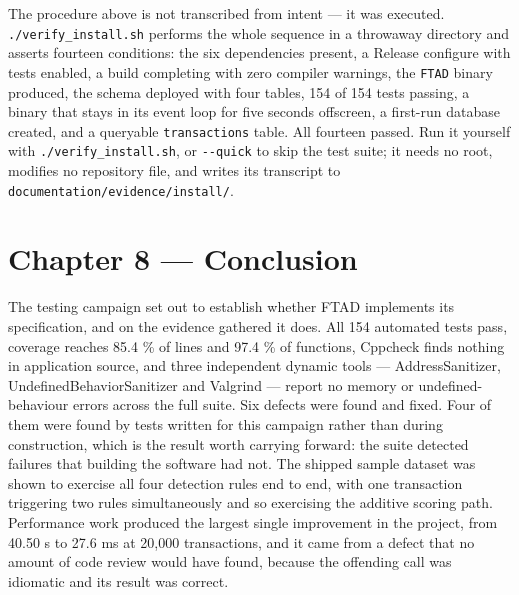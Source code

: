 \documentclass[
  12pt,
]{report}
\begin{document}
The procedure above is not transcribed from intent --- it was executed.
\texttt{./\allowbreak{}verify\_install.sh} performs the whole sequence in a throwaway
directory and asserts fourteen conditions: the six dependencies present,
a Release configure with tests enabled, a build completing with zero
compiler warnings, the \texttt{FTAD} binary produced, the schema
deployed with four tables, 154 of 154 tests passing, a binary that stays
in its event loop for five seconds offscreen, a first-run database
created, and a queryable \texttt{transactions} table. All fourteen
passed. Run it yourself with \texttt{./\allowbreak{}verify\_install.sh}, or
\texttt{-\/\allowbreak{}-quick} to skip the test suite; it needs no root, modifies no
repository file, and writes its transcript to
\texttt{documentation/\allowbreak{}evidence/\allowbreak{}install/\allowbreak{}}.

\chapter{Chapter 8 --- Conclusion}\label{chapter-8-conclusion}

The testing campaign set out to establish whether FTAD implements its
specification, and on the evidence gathered it does. All 154 automated
tests pass, coverage reaches 85.4 \% of lines and 97.4 \% of functions,
Cppcheck finds nothing in application source, and three independent
dynamic tools --- Address\-Sanitizer, Undefined\-Behavior\-Sanitizer and
Valgrind --- report no memory or undefined-behaviour errors across the
full suite. Six defects were found and fixed. Four of them were found by
tests written for this campaign rather than during construction, which
is the result worth carrying forward: the suite detected failures that
building the software had not. The shipped sample dataset was shown to
exercise all four detection rules end to end, with one transaction
triggering two rules simultaneously and so exercising the additive
scoring path. Performance work produced the largest single improvement
in the project, from 40.50 s to 27.6 ms at 20,000 transactions, and it
came from a defect that no amount of code review would have found,
because the offending call was idiomatic and its result was correct.
\end{document}
